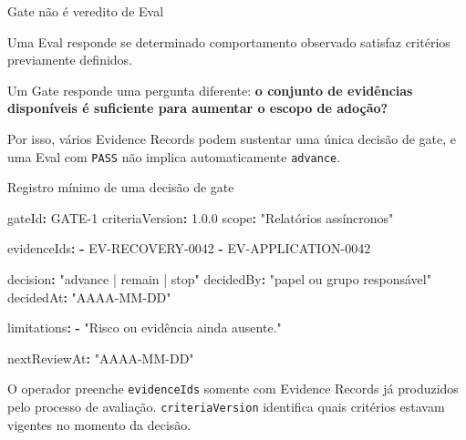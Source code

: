 \documentclass[
  10pt,
  a4paper,
  oneside]{book}
\newenvironment{Shaded}{}{}
\newcommand{\AttributeTok}[1]{\textcolor[rgb]{0.49,0.56,0.16}{#1}}
\newcommand{\FloatTok}[1]{\textcolor[rgb]{0.25,0.63,0.44}{#1}}
\newcommand{\FunctionTok}[1]{\textcolor[rgb]{0.02,0.16,0.49}{#1}}
\newcommand{\KeywordTok}[1]{\textcolor[rgb]{0.00,0.44,0.13}{\textbf{#1}}}
\newcommand{\StringTok}[1]{\textcolor[rgb]{0.25,0.44,0.63}{#1}}
\renewenvironment{Shaded}{\begin{snugshade}}{\end{snugshade}}%
\begin{document}

\begin{tipbox}{Gate não é veredito de Eval}

Uma Eval responde se determinado comportamento observado satisfaz
critérios previamente definidos.

Um Gate responde uma pergunta diferente: \textbf{o conjunto de
evidências disponíveis é suficiente para aumentar o escopo de adoção?}

Por isso, vários Evidence Records podem sustentar uma única decisão de
gate, e uma Eval com \texttt{PASS} não implica automaticamente
\texttt{advance}.

\end{tipbox}

\begin{examplebox}{Registro mínimo de uma decisão de gate}

\begin{Shaded}
\begin{Highlighting}[]
\FunctionTok{gateId}\KeywordTok{:}\AttributeTok{ GATE{-}1}
\FunctionTok{criteriaVersion}\KeywordTok{:}\AttributeTok{ }\FloatTok{1.0.0}
\FunctionTok{scope}\KeywordTok{:}\AttributeTok{ }\StringTok{"Relatórios assíncronos"}

\FunctionTok{evidenceIds}\KeywordTok{:}
\AttributeTok{  }\KeywordTok{{-}}\AttributeTok{ EV{-}RECOVERY{-}0042}
\AttributeTok{  }\KeywordTok{{-}}\AttributeTok{ EV{-}APPLICATION{-}0042}

\FunctionTok{decision}\KeywordTok{:}\AttributeTok{ }\StringTok{"advance | remain | stop"}
\FunctionTok{decidedBy}\KeywordTok{:}\AttributeTok{ }\StringTok{"papel ou grupo responsável"}
\FunctionTok{decidedAt}\KeywordTok{:}\AttributeTok{ }\StringTok{"AAAA{-}MM{-}DD"}

\FunctionTok{limitations}\KeywordTok{:}
\AttributeTok{  }\KeywordTok{{-}}\AttributeTok{ }\StringTok{"Risco ou evidência ainda ausente."}

\FunctionTok{nextReviewAt}\KeywordTok{:}\AttributeTok{ }\StringTok{"AAAA{-}MM{-}DD"}
\end{Highlighting}
\end{Shaded}

\end{examplebox}

O operador preenche \texttt{evidenceIds} somente com Evidence Records já
produzidos pelo processo de avaliação. \texttt{criteriaVersion}
identifica quais critérios estavam vigentes no momento da decisão.
\end{document}
